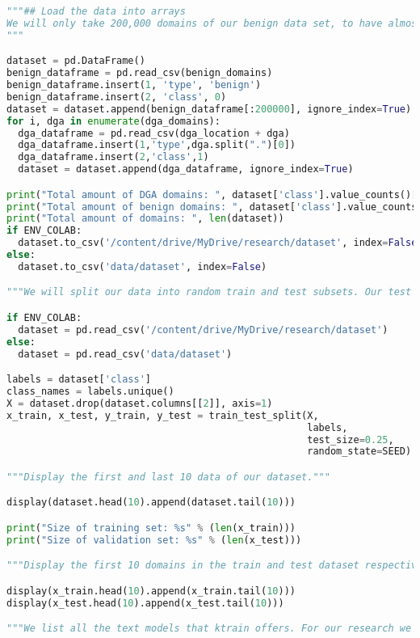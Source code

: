 \begin{lstlisting}[language=Python]
"""## Load the data into arrays
We will only take 200,000 domains of our benign data set, to have almost the same ratio of benign and DGA domains. In total we have 384,765 domains: 200,000 benign domains and 184765 DGA domains.
"""

dataset = pd.DataFrame()
benign_dataframe = pd.read_csv(benign_domains)
benign_dataframe.insert(1, 'type', 'benign')
benign_dataframe.insert(2, 'class', 0)
dataset = dataset.append(benign_dataframe[:200000], ignore_index=True)
for i, dga in enumerate(dga_domains):
  dga_dataframe = pd.read_csv(dga_location + dga)
  dga_dataframe.insert(1,'type',dga.split(".")[0])
  dga_dataframe.insert(2,'class',1)
  dataset = dataset.append(dga_dataframe, ignore_index=True)

print("Total amount of DGA domains: ", dataset['class'].value_counts()[1])
print("Total amount of benign domains: ", dataset['class'].value_counts()[0])
print("Total amount of domains: ", len(dataset))
if ENV_COLAB:
  dataset.to_csv('/content/drive/MyDrive/research/dataset', index=False)
else:
  dataset.to_csv('data/dataset', index=False)

"""We will split our data into random train and test subsets. Our test size will be 25%. Our random_state that control the randon number generated has to be given. Popular seeds are 42 or 0. We chose 42 for obvious reasons."""

if ENV_COLAB:
  dataset = pd.read_csv('/content/drive/MyDrive/research/dataset')
else:
  dataset = pd.read_csv('data/dataset')

labels = dataset['class']
class_names = labels.unique()
X = dataset.drop(dataset.columns[[2]], axis=1)
x_train, x_test, y_train, y_test = train_test_split(X,
                                                    labels,
                                                    test_size=0.25,
                                                    random_state=SEED)

"""Display the first and last 10 data of our dataset."""

display(dataset.head(10).append(dataset.tail(10)))

print("Size of training set: %s" % (len(x_train)))
print("Size of validation set: %s" % (len(x_test)))

"""Display the first 10 domains in the train and test dataset respectively."""

display(x_train.head(10).append(x_train.tail(10)))
display(x_test.head(10).append(x_test.tail(10)))

"""We list all the text models that ktrain offers. For our research we will use the distilbert model. Which is a faster, smaller and distilled version of BERT. """


\end{lstlisting}
